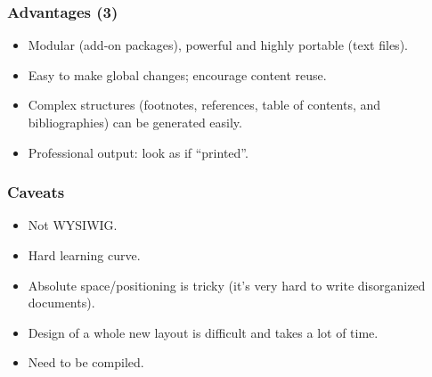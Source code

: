 \documentclass{beamer}
\begin{document}

\begin{frame}
\frametitle{Advantages (3)}

\begin{itemize}
\item Modular (add-on packages), powerful and highly portable (text files).
\item Easy to make global changes; encourage content reuse.
\item Complex structures (footnotes, references, table of contents,
and bibliographies) can be generated easily.
\item Professional output: look as if ``printed''.
\end{itemize}

\end{frame}


\begin{frame}
\frametitle{Caveats}

\begin{itemize}

\item Not WYSIWIG.
\item Hard learning curve.
\item Absolute space/positioning is tricky (it's very hard to write disorganized documents).
\item Design of a whole new layout is difficult and takes a lot of time.
\item Need to be compiled.

\end{itemize}

\end{frame}


\end{document}
